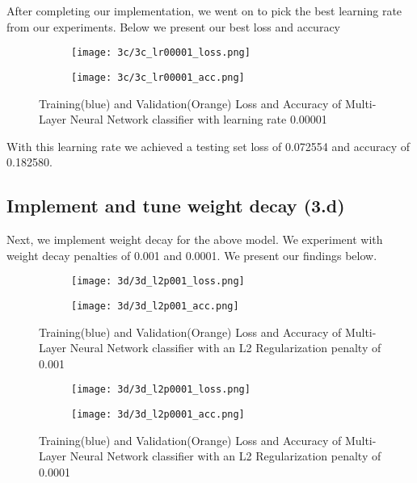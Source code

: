 \documentclass{article} %
\begin{document}
After completing our implementation, we went on to pick the best learning rate from our experiments. Below we present our best loss and accuracy

\begin{figure}[H]
\centering
\begin{subfigure}{.5\textwidth}
  \centering
  \texttt{[image: 3c/3c\_lr00001\_loss.png]}
  \label{fig:sub1}
\end{subfigure}%
\begin{subfigure}{.5\textwidth}
  \centering
\texttt{[image: 3c/3c\_lr00001\_acc.png]}
  \label{fig:sub2}
\end{subfigure}
\caption{Training(blue) and Validation(Orange) Loss and Accuracy of Multi-Layer Neural Network classifier with learning rate 0.00001}
\label{fig:test}
\end{figure}

With this learning rate we achieved a testing set loss of 0.072554 and accuracy of 0.182580.

\subsection{Implement and tune weight decay (3.d)}
Next, we implement weight decay for the above model. We experiment with weight decay penalties of 0.001 and 0.0001. We present our findings below.

\begin{figure}[H]
\centering
\begin{subfigure}{.5\textwidth}
  \centering
  \texttt{[image: 3d/3d\_l2p001\_loss.png]}
  \label{fig:sub1}
\end{subfigure}%
\begin{subfigure}{.5\textwidth}
  \centering
\texttt{[image: 3d/3d\_l2p001\_acc.png]}
  \label{fig:sub2}
\end{subfigure}
\caption{Training(blue) and Validation(Orange) Loss and Accuracy of Multi-Layer Neural Network classifier with an L2 Regularization penalty of 0.001}
\label{fig:test}
\end{figure}

\begin{figure}[H]
\centering
\begin{subfigure}{.5\textwidth}
  \centering
  \texttt{[image: 3d/3d\_l2p0001\_loss.png]}
  \label{fig:sub1}
\end{subfigure}%
\begin{subfigure}{.5\textwidth}
  \centering
\texttt{[image: 3d/3d\_l2p0001\_acc.png]}
  \label{fig:sub2}
\end{subfigure}
\caption{Training(blue) and Validation(Orange) Loss and Accuracy of Multi-Layer Neural Network classifier with an L2 Regularization penalty of 0.0001}
\label{fig:test}
\end{figure}
\end{document}
